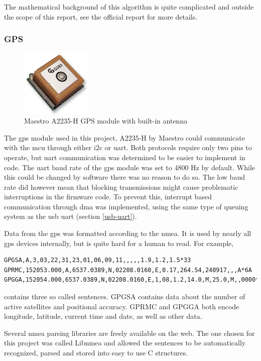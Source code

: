 The mathematical background of this algorithm is quite complicated and outside the scope of this report, see the official report \cite{madgwick-report} for more details.

\subsubsection{GPS}
\begin{figure}[H]
\centering
\includegraphics[width=0.3\textwidth]{Figures/A2235-H.jpg}
\caption{Maestro A2235-H GPS module with built-in antenna}
\label{gps-figure}
\end{figure}
The \gls{gps} module used in this project, A2235-H by Maestro \cite{gps} could communicate with the \gls{mcu} through either \gls{i2c} or \gls{uart}. Both protocols require only two pins to operate, but \gls{uart} communication was determined to be easier to implement in code. The \gls{uart} baud rate of the \gls{gps} module was set to 4800 Hz by default. While this could be changed by software there was no reason to do so. The low baud rate did however mean that blocking transmissions might cause problematic interruptions in the firmware code. To prevent this, interrupt based communication through \gls{dma} was implemented, using the same type of queuing system as the \gls{usb} \gls{uart} (section \ref{usb-uart}).

Data from the \gls{gps} was formatted according to the \gls{nmea}. It is used by nearly all \gls{gps} devices internally, but is quite hard for a human to read. For example,
\begin{lstlisting}
GPGSA,A,3,03,22,31,23,01,06,09,11,,,,,1.9,1.2,1.5*33
GPRMC,152053.000,A,6537.0389,N,02208.0160,E,0.17,264.54,240917,,,A*6A
GPGGA,152054.000,6537.0389,N,02208.0160,E,1,08,1.2,14.0,M,25.0,M,,0000*68
\end{lstlisting}
contains three so called sentences. GPGSA contains data about the number of active satellites and positional accuracy. GPRMC and GPGGA both encode longitude, latitude, current time and date, as well as other data.

Several \gls{nmea} parsing libraries are freely available on the web. The one chosen for this project was called Libnmea \cite{libnmea} and allowed the sentences to be automatically recognized, parsed and stored into easy to use C structures.



